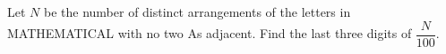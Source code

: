 Let $N$ be the number of distinct arrangements of the letters in MATHEMATICAL with no two As adjacent. Find the last three digits of $\dfrac{N}{100}$.
